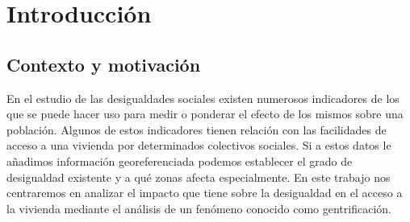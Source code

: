 \documentclass[12pt,a4paper,twoside]{book}
\begin{document}
\setcounter{section}{0} %
\renewcommand{\thesection}{\arabic{section}} %


\newpage

\newpage

\pagestyle{fancy}
\renewcommand{\chaptermark}[1]{ \markboth{#1}{}}
\renewcommand{\sectionmark}[1]{\markright{ \thesection.\ #1}}
\lhead[\fancyplain{}{\bfseries\thepage}]{\fancyplain{}{\bfseries\rightmark}}
\rhead[\fancyplain{}{\bfseries\leftmark}]{\fancyplain{}{\bfseries\thepage}}
\cfoot{}

\cleardoublepage
{}
{}
\tableofcontents
\cleardoublepage
{}
{}
\listoffigures
\cleardoublepage
{}
{}
\listoftables
\cleardoublepage    %

\thispagestyle{empty}


\pagestyle{fancy}
\renewcommand{\chaptermark}[1]{ \markboth{#1}{}}
\renewcommand{\sectionmark}[1]{\markright{ \thesection.\ #1}}
\lhead[\fancyplain{}{\bfseries\thepage}]{\fancyplain{}{\bfseries\rightmark}}
\rhead[\fancyplain{}{\bfseries\leftmark}]{\fancyplain{}{\bfseries\thepage}}
\cfoot{}

\onehalfspacing

\chapter{Introducción}

\section{Contexto y motivación}

En el estudio de las desigualdades sociales existen numerosos indicadores de los que se puede hacer uso para medir o ponderar el efecto de los mismos sobre una población. Algunos de estos indicadores tienen relación con las facilidades de acceso a una vivienda por determinados colectivos sociales. Si a estos datos le añadimos información georeferenciada podemos establecer el grado de desigualdad existente y a qué zonas afecta especialmente. En este trabajo nos centraremos en analizar el impacto que tiene sobre la desigualdad en el acceso a la vivienda mediante el análisis de un fenómeno conocido como gentrificación.
\end{document}
